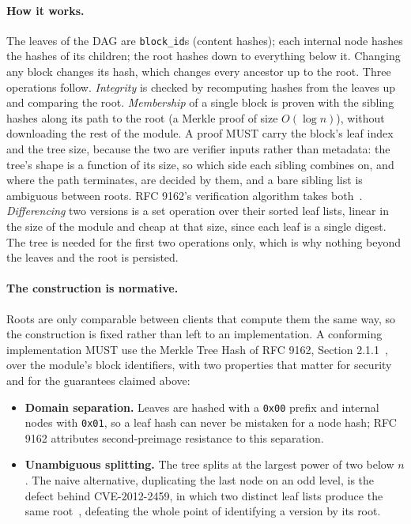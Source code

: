 \documentclass[11pt,a4paper]{article}
\begin{document}
\paragraph{How it works.}
The leaves of the DAG are \texttt{block\_id}s (content hashes); each internal
node hashes the hashes of its children; the root hashes down to everything
below it. Changing any block changes its hash, which changes every ancestor up to the
root. Three operations follow. \emph{Integrity} is checked by
recomputing hashes from the leaves up and comparing the root. \emph{Membership} of a single block is proven with the sibling hashes along
its path to the root (a Merkle proof of size $O(\log n)$), without downloading
the rest of the module. A proof MUST carry the block's leaf index and the tree
size, because the two are verifier inputs rather than metadata: the tree's
shape is a function of its size, so which side each sibling combines on, and
where the path terminates, are decided by them, and a bare sibling list is
ambiguous between roots. RFC 9162's verification algorithm takes
both~\cite{rfc9162}. \emph{Differencing} two versions is a set operation over their sorted leaf
lists, linear in the size of the module and cheap at that size, since each
leaf is a single digest. The tree is needed for the first two operations only,
which is why nothing beyond the leaves and the root is persisted.

\paragraph{The construction is normative.}
Roots are only comparable between clients that compute them the same way, so the
construction is fixed rather than left to an implementation. A conforming
implementation MUST use the Merkle Tree Hash of RFC 9162, Section
2.1.1~\cite{rfc9162}, over the module's block identifiers, with two properties
that matter for security and for the guarantees claimed above:

\begin{itemize}[leftmargin=1.4em]
  \item \textbf{Domain separation.} Leaves are hashed with a \texttt{0x00}
prefix and internal nodes with \texttt{0x01}, so a leaf hash can never be
mistaken for a node hash; RFC 9162 attributes second-preimage resistance to
this separation.
  \item \textbf{Unambiguous splitting.} The tree splits at the largest power of
  two below $n$. The naive alternative, duplicating the last node on an odd level, is the
defect behind CVE-2012-2459, in which two distinct leaf lists produce the same
root~\cite{cve2012merkle}, defeating the whole point of identifying a version
by its root.
\end{itemize}
\end{document}
